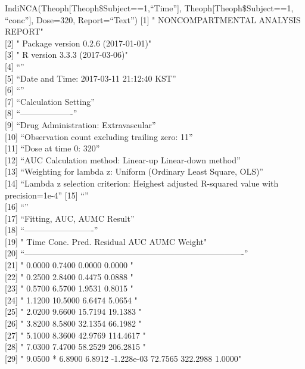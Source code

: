 \documentclass[]{krantz}
\renewenvironment{quote}{\begin{VF}}{\end{VF}}
\theoremstyle{definition}
\theoremstyle{definition}
\theoremstyle{definition}
\theoremstyle{remark}
\begin{document}
\begin{quote}
IndiNCA(Theoph{[}Theoph\$Subject==1,``Time''{]},
Theoph{[}Theoph\$Subject==1, ``conc''{]}, Dose=320, Report=``Text'')
{[}1{]} " NONCOMPARTMENTAL ANALYSIS REPORT"\\
{[}2{]} " Package version 0.2.6 (2017-01-01)"\\
{[}3{]} " R version 3.3.3 (2017-03-06)"\\
{[}4{]} ``''\\
{[}5{]} ``Date and Time: 2017-03-11 21:12:40 KST''\\
{[}6{]} ``''\\
{[}7{]} ``Calculation Setting''\\
{[}8{]} ``-------------------''\\
{[}9{]} ``Drug Administration: Extravascular''\\
{[}10{]} ``Observation count excluding trailing zero: 11''\\
{[}11{]} ``Dose at time 0: 320''\\
{[}12{]} ``AUC Calculation method: Linear-up Linear-down method''\\
{[}13{]} ``Weighting for lambda z: Uniform (Ordinary Least Square,
OLS)''\\
{[}14{]} ``Lambda z selection criterion: Heighest adjusted R-squared
value with precision=1e-4'' {[}15{]} ``''\\
{[}16{]} ``''\\
{[}17{]} ``Fitting, AUC, AUMC Result''\\
{[}18{]} ``-------------------------''\\
{[}19{]} " Time Conc. Pred. Residual AUC AUMC Weight"\\
{[}20{]}
``-------------------------------------------------------------------------------''\\
{[}21{]} " 0.0000 0.7400 0.0000 0.0000 "\\
{[}22{]} " 0.2500 2.8400 0.4475 0.0888 "\\
{[}23{]} " 0.5700 6.5700 1.9531 0.8015 "\\
{[}24{]} " 1.1200 10.5000 6.6474 5.0654 "\\
{[}25{]} " 2.0200 9.6600 15.7194 19.1383 "\\
{[}26{]} " 3.8200 8.5800 32.1354 66.1982 "\\
{[}27{]} " 5.1000 8.3600 42.9769 114.4617 "\\
{[}28{]} " 7.0300 7.4700 58.2529 206.2815 "\\
{[}29{]} " 9.0500 * 6.8900 6.8912 -1.228e-03 72.7565 322.2988 1.0000"\\

\end{quote}
\end{document}
